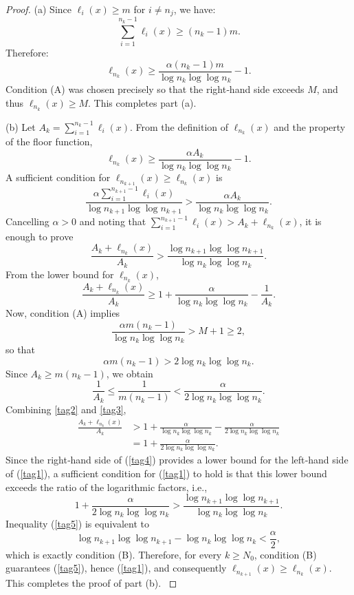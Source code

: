 \documentclass{article}
\numberwithin{equation}{section}
\begin{document}
\begin{proof}
(a) Since $\ell_i(x) \geq m$ for $i \neq n_j$, we have:
\[
\sum_{i=1}^{n_k-1} \ell_i(x) \geq (n_k - 1)m.
\]
Therefore:
\[
\ell_{n_k}(x) \geq \frac{\alpha (n_k - 1)m}{\log n_k \log \log n_k} - 1.
\]
{Condition (A) was chosen precisely so that the right‑hand side exceeds $M$, and thus $\ell_{n_k}(x) \geq M$. This completes part (a).
}

\noindent 
(b)
{Let $A_k = \sum_{i=1}^{n_k-1} \ell_i(x)$. From the definition of $\ell_{n_k}(x)$ and the property of the floor function,
\[
\ell_{n_k}(x) \geq \frac{\alpha A_k}{\log n_k \log \log n_k} - 1.
\]
%
A sufficient condition for $\ell_{n_{k+1}}(x) \geq \ell_{n_k}(x)$ is
\[
\frac{\alpha \sum_{i=1}^{n_{k+1}-1} \ell_i(x)}{\log n_{k+1} \log \log n_{k+1}} > \frac{\alpha A_k}{\log n_k \log \log n_k}.
\]
Cancelling $\alpha > 0$ and noting that $\sum_{i=1}^{n_{k+1}-1} \ell_i(x) > A_k + \ell_{n_k}(x)$, it is enough to prove
\begin{equation}
\frac{A_k + \ell_{n_k}(x)}{A_k} > \frac{\log n_{k+1} \log \log n_{k+1}}{\log n_k \log \log n_k}. \label{tag1}
\end{equation}
%
From the lower bound for $\ell_{n_k}(x)$,
\begin{equation}
\frac{A_k + \ell_{n_k}(x)}{A_k} \geq 1 + \frac{\alpha}{\log n_k \log \log n_k} - \frac{1}{A_k}. \label{tag2}
\end{equation}
%
Now, condition (A) implies
\[
\frac{\alpha m (n_k - 1)}{\log n_k \log \log n_k} > M + 1 \geq 2,
\]
so that
\[
\alpha m (n_k - 1) > 2 \log n_k \log \log n_k.
\]
Since $A_k \geq m (n_k - 1)$, we obtain
\begin{equation}
\frac{1}{A_k} \leq \frac{1}{m (n_k - 1)} < \frac{\alpha}{2 \log n_k \log \log n_k}. \label{tag3}
\end{equation}
%
Combining \ref{tag2} and \ref{tag3},
\begin{align}
\frac{A_k + \ell_{n_k}(x)}{A_k} &> 1 + \frac{\alpha}{\log n_k \log \log n_k} - \frac{\alpha}{2 \log n_k \log \log n_k} \nonumber \\
&= 1 + \frac{\alpha}{2 \log n_k \log \log n_k}. \label{tag4}
\end{align}
%
{Since the right‑hand side of (\ref{tag4}) provides a lower bound for the left‑hand side of (\ref{tag1}), a sufficient condition for (\ref{tag1}) to hold is that this lower bound exceeds the ratio of the logarithmic factors, i.e.,}
\begin{equation}
1 + \frac{\alpha}{2 \log n_k \log \log n_k} > \frac{\log n_{k+1} \log \log n_{k+1}}{\log n_k \log \log n_k}. \label{tag5}
\end{equation}
%
Inequality (\ref{tag5}) is equivalent to
\[
\log n_{k+1} \log \log n_{k+1} - \log n_k \log \log n_k < \frac{\alpha}{2},
\]
which is exactly condition (B). Therefore, for every $k \geq N_0$, condition (B) guarantees (\ref{tag5}), hence (\ref{tag1}), and consequently $\ell_{n_{k+1}}(x) \geq \ell_{n_k}(x)$. This completes the proof of part (b).
}
\end{proof}
\end{document}
